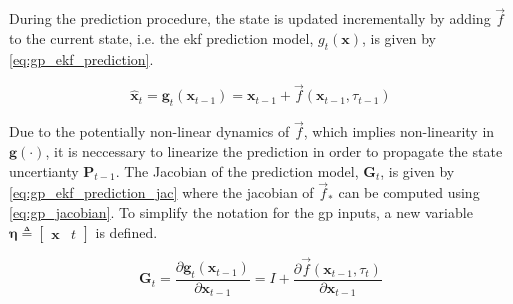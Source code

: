 During the prediction procedure, the state is updated incrementally by adding $\vec{f}$ to the current state, i.e. the \acrshort{ekf} prediction model, $g_t(\boldsymbol{x})$, is given by \cref{eq:gp_ekf_prediction}.

\begin{equation}\label{eq:gp_ekf_prediction}
    \hat{\boldsymbol{x}}_{t} = \boldsymbol{g}_t(\boldsymbol{x}_{t-1}) = \boldsymbol{x}_{t-1} + \vec{f}(\boldsymbol{x}_{t-1}, \tau_{t-1})
\end{equation}

Due to the potentially non-linear dynamics of $\vec{f}$, which implies non-linearity in $\boldsymbol{g}(\cdot)$, it is neccessary to linearize the prediction in order to propagate the state uncertianty $\boldsymbol{P}_{t-1}$. The Jacobian of the prediction model, $\boldsymbol{G}_t$, is given by \cref{eq:gp_ekf_prediction_jac} where the jacobian of $\vec{f}_*$ can be computed using \cref{eq:gp_jacobian}. To simplify the notation for the \acrshort{gp} inputs, a new variable $\boldsymbol{\eta} \triangleq \begin{bmatrix}
        \boldsymbol{x} & t
    \end{bmatrix}$ is defined.

\begin{equation}\label{eq:gp_ekf_prediction_jac}
    \boldsymbol{G}_t = \frac{\partial \boldsymbol{g}_t(\boldsymbol{x}_{t-1})}{\partial \boldsymbol{x}_{t-1}} = I + \frac{\partial \vec{f}(\boldsymbol{x}_{t-1}, \tau_t)}{\partial \boldsymbol{x}_{t-1}}
\end{equation}

